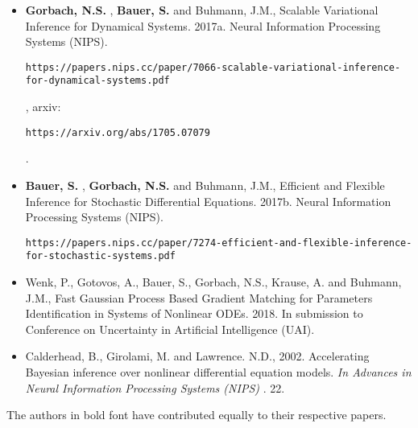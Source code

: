 \begin{itemize}
\setlength{\itemsep}{-1ex}
   \item \textbf{Gorbach, N.S.} , \textbf{Bauer, S.} and Buhmann, J.M., Scalable Variational Inference for Dynamical Systems. 2017a. Neural Information Processing Systems (NIPS). \begin{verbatim}https://papers.nips.cc/paper/7066-scalable-variational-inference-for-dynamical-systems.pdf\end{verbatim}, arxiv: \begin{verbatim}https://arxiv.org/abs/1705.07079\end{verbatim}.
   \item \textbf{Bauer, S.} , \textbf{Gorbach, N.S.} and Buhmann, J.M., Efficient and Flexible Inference for Stochastic Differential Equations. 2017b. Neural Information Processing Systems (NIPS). \begin{verbatim}https://papers.nips.cc/paper/7274-efficient-and-flexible-inference-for-stochastic-systems.pdf\end{verbatim}
   \item Wenk, P., Gotovos, A., Bauer, S., Gorbach, N.S., Krause, A. and Buhmann, J.M., Fast Gaussian Process Based Gradient Matching for Parameters Identification in Systems of Nonlinear ODEs. 2018. In submission to Conference on Uncertainty in Artificial Intelligence (UAI).
   \item Calderhead, B., Girolami, M. and Lawrence. N.D., 2002. Accelerating Bayesian inference over nonlinear differential equation models. \textit{In Advances in Neural Information Processing Systems (NIPS)} . 22.
\end{itemize}
\begin{par}
The authors in bold font have contributed equally to their respective papers.
\end{par} \vspace{1em}